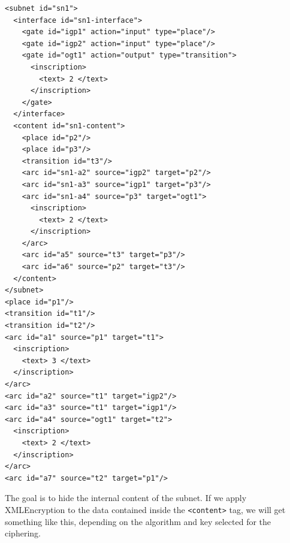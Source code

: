 \begin{lstlisting}
<subnet id="sn1">
  <interface id="sn1-interface">
    <gate id="igp1" action="input" type="place"/>
    <gate id="igp2" action="input" type="place"/>
    <gate id="ogt1" action="output" type="transition">
      <inscription>
        <text> 2 </text>
      </inscription>
    </gate>
  </interface>
  <content id="sn1-content">
    <place id="p2"/>
    <place id="p3"/>
    <transition id="t3"/>
    <arc id="sn1-a2" source="igp2" target="p2"/>
    <arc id="sn1-a3" source="igp1" target="p3"/>
    <arc id="sn1-a4" source="p3" target="ogt1">
      <inscription>
        <text> 2 </text>
      </inscription>
    </arc>
    <arc id="a5" source="t3" target="p3"/>
    <arc id="a6" source="p2" target="t3"/>
  </content>
</subnet>
<place id="p1"/>
<transition id="t1"/>
<transition id="t2"/>
<arc id="a1" source="p1" target="t1">
  <inscription>
    <text> 3 </text>
  </inscription>
</arc>
<arc id="a2" source="t1" target="igp2"/>
<arc id="a3" source="t1" target="igp1"/>
<arc id="a4" source="ogt1" target="t2">
  <inscription>
    <text> 2 </text>
  </inscription>
</arc>
<arc id="a7" source="t2" target="p1"/>
\end{lstlisting}

The goal is to hide the internal content of the subnet. If we apply XMLEncryption
to the data contained inside the \texttt{<content>} tag, we will get something like this, depending on the algorithm and key selected for the ciphering.

